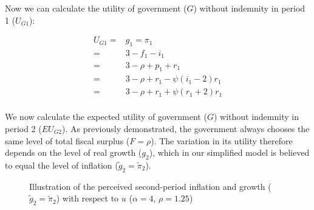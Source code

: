 \documentclass[
  a4paper,
  abstract=true]{scrartcl}
\theoremstyle{definition}
\begin{document}
Now we can calculate the utility of government (\(G\)) without indemnity
in period 1 (\(U_{G1}\)):

\begin{align*}
U_{G1}=&g_{1}=\pi_{1}\\
=&3-f_1-i_1\\
=&3-\rho+p_1+r_1\\
=&3-\rho+r_1-\psi(i_1-2)r_1\\
=&3-\rho+r_1+\psi(r_1+2)r_1\\
\end{align*}

We now calculate the expected utility of government (\(G\)) without
indemnity in period 2 (\(EU_{G2}\)). As previously demonstrated, the
government always chooses the same level of total fiscal surplus
(\(F=\rho\)). The variation in its utility therefore depends on the
level of real growth (\(g_2\)), which in our simplified model is
believed to equal the level of inflation (\(\tilde g_2=\tilde\pi_2\)).

\begin{figure}


\caption{\label{fig-pi2-ana}Illustration of the perceived second-period
inflation and growth (\(\tilde g_2=\tilde\pi_2\)) with respect to \(u\)
(\(\alpha=4\), \(\rho=1.25\))}

\end{figure}%
\end{document}
